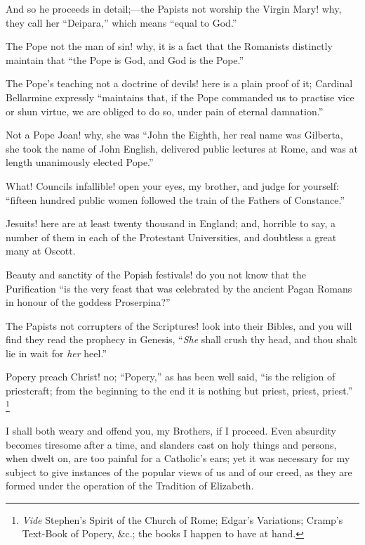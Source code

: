 And so he proceeds in detail;—the Papists not
worship the Virgin Mary! why, they call her
``Deipara,'' which means ``equal to
God.''

The Pope not the man of sin! why, it is a fact that
the Romanists distinctly maintain that ``the Pope is
God, and God is the Pope.''

The Pope's teaching not a doctrine of devils! here is
a plain proof of it; Cardinal Bellarmine expressly
``maintains that, if the Pope commanded us to
practise vice or shun virtue, we are obliged to do so,
under pain of eternal damnation.''

Not a Pope Joan! why, she was ``John the Eighth,
her real name was Gilberta, she took the name of John
English, delivered public lectures at Rome, and was at
length unanimously elected Pope.''

What! Councils infallible! open your eyes, my brother,
and judge for yourself: ``fifteen hundred public
women followed the train of the Fathers of
Constance.''

Jesuits! here are at least twenty thousand in England;
and, horrible to say, a number of them in each of the
Protestant Universities, and doubtless a great many at
Oscott.

Beauty and sanctity of the Popish festivals! do you
not know that the Purification ``is the very feast
that was celebrated by the ancient Pagan Romans in honour
of the goddess Proserpina?''

The Papists not corrupters of the Scriptures! look
into their Bibles, and you will find they read the
prophecy in Genesis, ``\emph{She} shall crush thy head, and
thou shalt lie in wait for \emph{her} heel.''

Popery preach Christ! no; ``Popery,'' as has
been well said, ``is the religion of priestcraft;
from the beginning to the end it is nothing but priest,
priest, priest.'' \footnote{\emph{Vide} Stephen's Spirit
of the Church of Rome; Edgar's Variations; Cramp's
Text-Book of Popery, \&c.; the books I happen to have
at hand.}

I shall both weary and offend you, my Brothers, if I
proceed. Even absurdity becomes tiresome after a time,
and slanders cast on holy things and persons, when dwelt
on, are too painful for a Catholic's ears; yet it was
necessary for my subject to give instances of the popular
views of us and of our creed, as they are formed under
the operation of the Tradition of Elizabeth.

